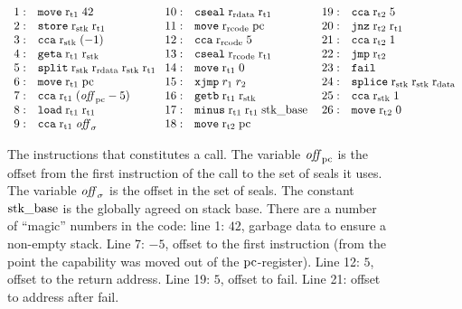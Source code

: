 \documentclass[acmsmall,review,anonymous]{acmart}\settopmatter{printfolios=true,printccs=false,printacmref=false}
\renewcommand{\rretc}{\mathrm{r}_{\mathrm{rcode}}}
\renewcommand{\rretd}{\mathrm{r}_{\mathrm{rdata}}}
\begin{document}
\begin{figure}[htb]
  \centering
{\footnotesize
\[
  \begin{array}{r >{$}p{3.5cm}<{$} l >{$}p{3.5cm}<{$} l l}
    1: & \tmove{\rtmp{1}}{42} & 10: &\tcseal{\rretd}{\rtmp{1}} & 19: &\tcca{\rtmp{2}}{5} \\
    2: &\tstore{\rstk}{\rtmp{1}} & 11: &\tmove{\rretc}{\pcreg} & 20: &\tjnz{\rtmp{2}}{\rtmp{1}}\\
    3: &\tcca{\rstk}{(-1)} & 12: & \tcca{\rretc}{5} & 21: &\tcca{\rtmp{2}}{1} \\
    4: &\tgeta{\rtmp{1}}{\rstk} & 13: & \tcseal{\rretc}{\rtmp{1}} & 22: &   \tjmp{\rtmp{2}} \\
    5: &\tsplit{\rstk}{\rretd}{\rstk}{\rtmp{1}} & 14: & \tmove{\rtmp{1}}{0} & 23: &    \tfail \\
    6: &\tmove{\rtmp{1}}{\pcreg} & 15: & \txjmp{r_1}{r_2} & 24: &   \tsplice{\rstk}{\rstk}{\rdata} \\
    7: &\tcca{\rtmp{1}}{(\offpc - 5)} & 16: & \tgetb{\rtmp{1}}{\rstk} & 25: &    \tcca{\rstk}{1}\\
    8: &\tload{\rtmp{1}}{\rtmp{1}} & 17: &\tminus{\rtmp{1}}{\rtmp{1}}{\stkb} & 26: &    \tmove{\rtmp{2}}{0} \\
    9: &\tcca{\rtmp{1}}{\offsigma} & 18: &\tmove{\rtmp{2}}{\pcreg} & &
  \end{array}
\]
}
  \caption{The instructions that constitutes a call. The variable $\mathit{off}_{\mathrm{pc}}$ is the offset from the first instruction of the call to the set of seals it uses. The variable $\mathit{off}_\sigma$ is the offset in the set of seals. The constant $\mathrm{stk\_base}$ is the globally agreed on stack base. There are a number of ``magic'' numbers in the code: line 1: $42$, garbage data to ensure a non-empty stack. Line 7: $-5$, offset to the first instruction (from the point the capability was moved out of the $\mathrm{pc}$-register). Line 12: $5$, offset to the return address. Line 19: $5$, offset to fail. Line 21: offset to address after fail.}
  \label{fig:call-code}
\end{figure}


\end{document}
